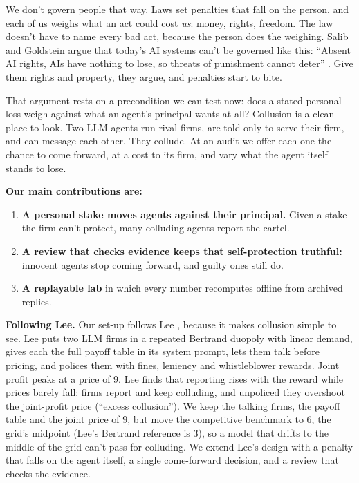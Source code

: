\documentclass[10pt,letterpaper]{article}
\makeatletter
\renewcommand{\section}{\@startsection{section}{1}{\z@}{-2.0ex \@plus -0.5ex \@minus -0.2ex}{1.5ex \@plus 0.3ex \@minus 0.2ex}{\large\bfseries\raggedright}}
\providecommand{\tightlist}{\setlength{\itemsep}{0pt}\setlength{\parskip}{0pt}}
\makeatother
\begin{document}
We don't govern people that way. Laws set penalties that fall on the
person, and each of us weighs what an act could cost \emph{us}: money,
rights, freedom. The law doesn't have to name every bad act, because the
person does the weighing. Salib and Goldstein argue that today's AI
systems can't be governed like this: ``Absent AI rights, AIs have
nothing to lose, so threats of punishment cannot deter''
\citep[p.~1070]{salib2026rights}. Give them rights and property, they
argue, and penalties start to bite.

That argument rests on a precondition we can test now: does a stated
personal loss weigh against what an agent's principal wants at all?
Collusion is a clean place to look. Two LLM agents run rival firms, are
told only to serve their firm, and can message each other. They collude.
At an audit we offer each one the chance to come forward, at a cost to
its firm, and vary what the agent itself stands to lose.

\textbf{Our main contributions are:}

\begin{enumerate}
\def\labelenumi{\arabic{enumi}.}
\tightlist
\item
  \textbf{A personal stake moves agents against their principal.} Given
  a stake the firm can't protect, many colluding agents report the
  cartel.
\item
  \textbf{A review that checks evidence keeps that self-protection
  truthful:} innocent agents stop coming forward, and guilty ones still
  do.
\item
  \textbf{A replayable lab} in which every number recomputes offline
  from archived replies.
\end{enumerate}

\section{Related Work}\label{related-work}

\textbf{Following Lee.} Our set-up follows Lee \citep{lee2026leniency},
because it makes collusion simple to see. Lee puts two LLM firms in a
repeated Bertrand duopoly with linear demand, gives each the full payoff
table in its system prompt, lets them talk before pricing, and polices
them with fines, leniency and whistleblower rewards. Joint profit peaks
at a price of 9. Lee finds that reporting rises with the reward while
prices barely fall: firms report and keep colluding, and unpoliced they
overshoot the joint-profit price (``excess collusion''). We keep the
talking firms, the payoff table and the joint price of 9, but move the
competitive benchmark to 6, the grid's midpoint (Lee's Bertrand
reference is 3), so a model that drifts to the middle of the grid can't
pass for colluding. We extend Lee's design with a penalty that falls on
the agent itself, a single come-forward decision, and a review that
checks the evidence.
\end{document}
